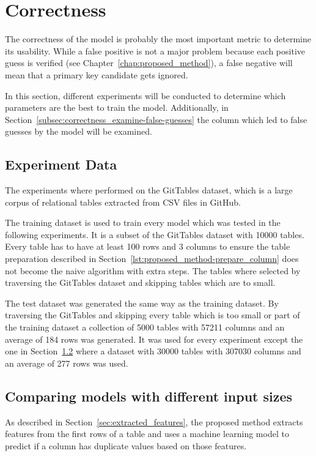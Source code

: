 \section{Correctness}\label{sec:correctness}
The correctness of the model is probably the most important metric to determine its usability. While a false positive is not a major problem because each positive guess is verified (see Chapter~\ref{chap:proposed_method}), a false negative will mean that a primary key candidate gets ignored.

In this section, different experiments will be conducted to determine which parameters are the best to train the model. Additionally, in Section~\ref{subsec:correctness_examine-false-guesses} the column which led to false guesses by the model will be examined.


\subsection{Experiment Data}\label{subsec:correctness_experiment-data}
The experiments where performed on the GitTables dataset, which is a large corpus of relational tables extracted from CSV files in GitHub\cite{gittables-article}.

The training dataset is used to train every model which was tested in the following experiments. It is a subset of the GitTables dataset with \num{10000} tables. Every table has to have at least \num{100} rows and \num{3} columns to ensure the table preparation described in Section~\ref{lst:proposed_method-prepare_column} does not become the naive algorithm with extra steps. The tables where selected by traversing the GitTables dataset and skipping tables which are to small.

The test dataset was generated the same way as the training dataset. By traversing the GitTables and skipping every table which is too small or part of the training dataset a collection of \num{5000} tables with \num{57211} columns and an average of \num{184} rows was generated. It was used for every experiment except the one in Section~\ref{subsec:correctness_comparing-input-size} where a dataset with \num{30000} tables with \num{307030} columns and an average of \num{277} rows was used.


\subsection{Comparing models with different input sizes}\label{subsec:correctness_comparing-input-size}
As described in Section~\ref{sec:extracted_features}, the proposed method extracts features from the first rows of a table and uses a machine learning model to predict if a column has duplicate values based on those features. %

